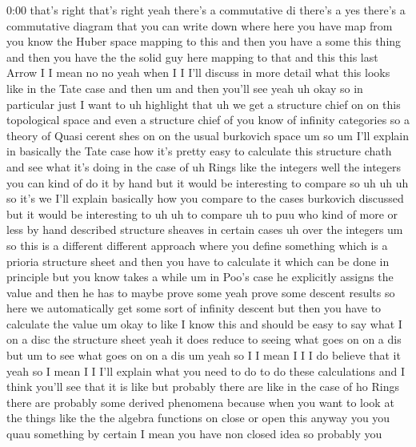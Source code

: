 \begin{unfinished}{0:00}
that's  right  that's  right  yeah  there's  a
commutative  di  there's  a  yes  there's  a
commutative  diagram  that  you  can  write
down  where  here  you  have  map  from  you
know  the  Huber  space  mapping  to  this  and
then  you  have  a  some  this  thing  and  then
you  have  the  the  solid  guy  here  mapping
to  that  and  this  this  last  Arrow  I  I
mean  no  no  yeah  when  I  I  I'll  discuss  in
more  detail  what  this  looks  like  in  the
Tate  case  and  then  um  and  then  you'll
see
yeah  uh  okay  so  in  particular  just  I
want  to  uh  highlight
that  uh  we  get  a  structure
chief  on  on  this  topological  space  and
even  a  structure  chief  of  you  know  of
infinity  categories  so  a  theory  of  Quasi
cerent  shes  on  on  the  usual  burkovich
space  um
so
um  I'll  explain  in  basically  the  Tate
case  how  it's  pretty  easy  to  calculate
this  structure  chath  and  see  what  it's
doing  in  the  case  of
uh  Rings  like  the  integers  well  the
integers  you  can  kind  of  do  it  by  hand
but  it  would  be  interesting  to  compare
so
uh  uh  uh  so  it's  we  I'll  explain
basically  how  you  compare  to  the  cases
burkovich  discussed  but  it  would  be
interesting  to
uh  uh  to
compare  uh  to
puu  who  kind
of  more  or  less  by  hand  described
structure  sheaves  in  certain  cases  uh
over  the
integers  um  so  this  is  a  different
different  approach  where  you  define
something  which  is  a  prioria  structure
sheet  and  then  you  have  to  calculate  it
which  can  be  done  in  principle  but  you
know  takes  a  while  um  in  Poo's  case  he
explicitly  assigns  the  value  and  then  he
has  to  maybe  prove  some  yeah  prove  some
descent  results  so  here  we  automatically
get  some  sort  of  infinity  descent  but
then  you  have  to  calculate  the
value  um
okay  to  like  I  know  this  and  should  be
easy  to  say  what  I  on  a  disc  the
structure  sheet
yeah  it  does  reduce  to  seeing  what  goes
on  on  a  dis  but
um  to  see  what  goes  on  on  a  dis  um  yeah
so  I  I  mean  I  I  I  do  believe  that  it
yeah
so  I  mean  I  I  I'll  explain  what  you  need
to  do  to  do  these  calculations  and  I
think  you'll  see  that  it  is  like  but
probably  there  are  like  in  the  case  of
ho  Rings  there  are  probably  some  derived
phenomena  because  when  you  want  to  look
at  the  things  like  the  the  algebra
functions  on  close  or  open  this  anyway
you  you  quau  something  by  certain  I  mean
you  have  non  closed  idea  so  probably  you

\end{unfinished}
